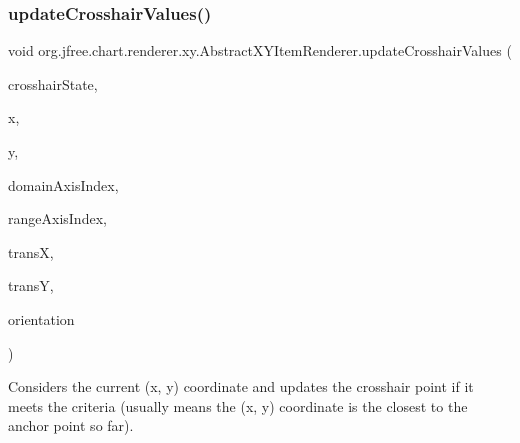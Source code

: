 \subsubsection{\texorpdfstring{update\+Crosshair\+Values()}{updateCrosshairValues()}\hspace{0.1cm}{\footnotesize\ttfamily [1/2]}}
{\footnotesize\ttfamily void org.\+jfree.\+chart.\+renderer.\+xy.\+Abstract\+X\+Y\+Item\+Renderer.\+update\+Crosshair\+Values (\begin{DoxyParamCaption}\item[{\mbox{\hyperlink{classorg_1_1jfree_1_1chart_1_1plot_1_1_crosshair_state}{Crosshair\+State}}}]{crosshair\+State,  }\item[{double}]{x,  }\item[{double}]{y,  }\item[{int}]{domain\+Axis\+Index,  }\item[{int}]{range\+Axis\+Index,  }\item[{double}]{transX,  }\item[{double}]{transY,  }\item[{\mbox{\hyperlink{classorg_1_1jfree_1_1chart_1_1plot_1_1_plot_orientation}{Plot\+Orientation}}}]{orientation }\end{DoxyParamCaption})\hspace{0.3cm}{\ttfamily [protected]}}

Considers the current (x, y) coordinate and updates the crosshair point if it meets the criteria (usually means the (x, y) coordinate is the closest to the anchor point so far).



